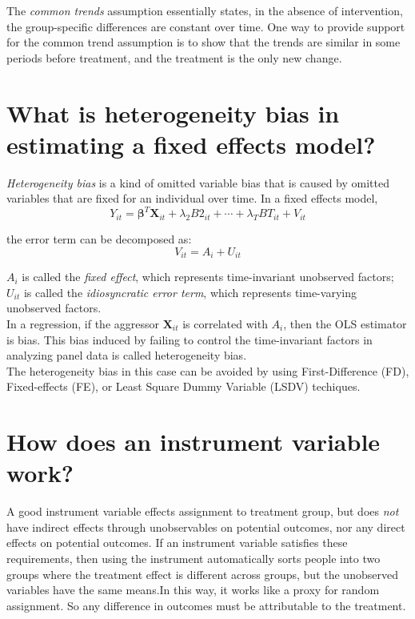 \documentclass[%
 aip,
 jmp,%
 amsmath,amssymb,
 reprint,%
]{revtex4-1}
\renewcommand{\vec}[1]{\bm{#1}}
\newcommand{\mat}[1]{\bm{#1}}
\newcommand{\term}[1]{\emph{#1}}
\begin{document}
The \term{common trends} assumption essentially states, in the absence of intervention, 
the group-specific differences are constant over time. One way to provide support for the 
common trend assumption is to show that the trends are similar in some periods before treatment, 
and the treatment is the only new change. \\

\section*{What is heterogeneity bias in estimating a fixed effects model?}

\term{Heterogeneity bias} is a kind of omitted variable bias that is caused by omitted variables 
that are fixed for an individual over time. In a fixed effects model, 
$$ Y_{it} = \vec{\beta}^T \mat{X}_{it} + \lambda_2 B2_{it} + \cdots + \lambda_T BT_{it} + V_{it} $$

the error term can be decomposed as:
$$ V_{it} = A_i + U_{it} $$

$A_i$ is called the \term{fixed effect}, which represents time-invariant unobserved factors;
$U_{it}$ is called the \term{idiosyncratic error term}, which represents time-varying unobserved factors.\\

In a regression, if the aggressor $\mat{X}_{it}$ is correlated with $A_i$, then the OLS estimator is bias. 
This bias induced by failing to control the time-invariant factors in analyzing panel data is called 
heterogeneity bias. \\

The heterogeneity bias in this case can be avoided by using First-Difference (FD), Fixed-effects (FE), 
or Least Square Dummy Variable (LSDV) techiques. \\


\section*{How does an instrument variable work?}

A good instrument variable effects assignment to treatment group, but does \emph{not} have indirect effects 
through unobservables on potential outcomes, nor any direct effects on potential outcomes. 
If an instrument variable satisfies these requirements, then using the instrument automatically sorts people 
into two groups where the treatment effect is different across groups, but the unobserved variables have the 
same means.In this way, it works like a proxy for random assignment. So any difference in outcomes must be 
attributable to the treatment. \\
\end{document}
